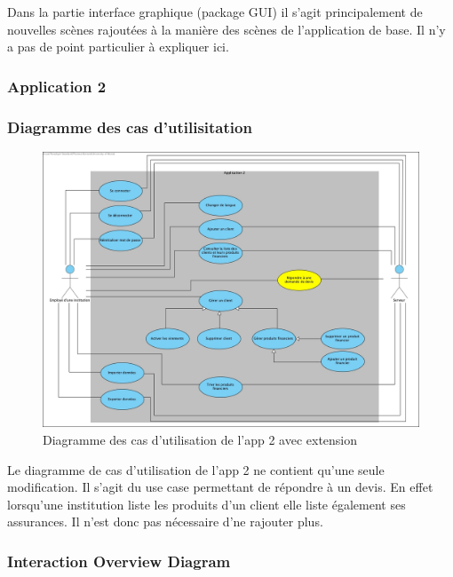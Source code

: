 \documentclass[../rapport.tex]{subfiles}
\begin{document}
		\bigskip

		Dans la partie interface graphique (package GUI) il s'agit principalement de nouvelles 
		scènes rajoutées à la manière des scènes de l'application de base. Il n'y a pas de 
		point particulier à expliquer ici.

		\subsubsection{Application 2}

		\subsubsection{Diagramme des cas d'utilisitation}

				\begin{figure}[h]
						\center\includegraphics[scale = 0.27]{ressources/photos_diagrammes/extensionThomas/useCase2Thomas.jpg}
						\caption{Diagramme des cas d'utilisation de l'app 2 avec extension}
				\end{figure}

				Le diagramme de cas d'utilisation de l'app 2 ne contient qu'une seule modification.
				Il s'agit du use case permettant de répondre à un devis. En effet lorsqu'une
				institution liste les produits d'un client elle liste également ses assurances.
				Il n'est donc pas nécessaire d'ne rajouter plus.

		\subsubsection{Interaction Overview Diagram}
\end{document}
